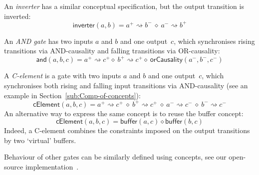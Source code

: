 \documentclass[british, journal]{IEEEtran}
\begin{document}
An \emph{inverter} has a similar conceptual specification, but the
output transition is inverted:
\[
\mathsf{inverter}(a, b)=a^{+}\rightsquigarrow b^{-}\ \diamond\ a^{-}\rightsquigarrow b^{+}
\]

An \emph{AND gate} has two inputs $a$ and $b$ and one output~$c$, which
synchronises rising transitions via AND-causality and falling transitions
via OR-causality:
\[
\mathsf{and}(a, b, c)=a^{+}\!\rightsquigarrow\!c^{+} \diamond\ b^{+}\!\rightsquigarrow\! c^{+} \diamond\ \mathsf{orCausality}(a^{-},b^{-},c^{-})
\]

A \emph{C-element} is a gate with two inputs $a$ and $b$ and one
output~$c$, which synchronises both rising and falling input transitions
via AND-causality (see an example in Section~\ref{sub:Comp-of-concepts}):
\[
\mathsf{cElement}(a, b, c)=a^{+}\!\rightsquigarrow\! c^{+}\ \diamond\ b^{+}\!\rightsquigarrow\! c^{+}\ \diamond\ a^{-}\!\rightsquigarrow\! c^{-}\ \diamond\ b^{-}\!\rightsquigarrow\! c^{-}
\]
An alternative way to express the same concept is to reuse the buffer concept:
\[
\mathsf{cElement}(a, b, c)=\mathsf{buffer}(a, c) \diamond \mathsf{buffer}(b, c)
\]
Indeed, a C-element combines the constraints imposed on the output
transitions by two `virtual' buffers.

Behaviour of other gates can be similarly defined using concepts,
see our open-source implementation~\cite{2016_concepts_github}.
\end{document}
